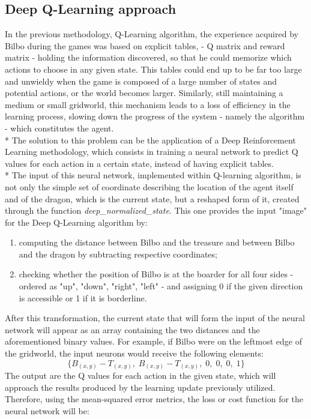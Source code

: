\subsection{Deep Q-Learning approach}
In the previous methodology, Q-Learning algorithm, the experience acquired by Bilbo during the games was based on explicit tables, - Q matrix and reward matrix - holding the information discovered, so that he could memorize which actions to choose in any given state. This tables could end up to be far too large and unwieldy when the game is composed of a large number of states and potential actions, or the world becomes larger. Similarly, still maintaining a medium or small gridworld, this mechanism leads to a loss of efficiency in the learning process, slowing down the progress of the system - namely the algorithm - which constitutes the agent.\\*
The solution to this problem can be the application of a Deep Reinforcement Learning methodology, which consists in training a neural network to predict Q values for each action in a certain state, instead of having explicit tables.\\*
The input of this neural network, implemented within Q-learning algorithm, is not only the simple set of coordinate describing the location of the agent itself and of the dragon, which is the current state, but a reshaped form of it, created through the function \textit{deep\_normalized\_state}. This one provides the input "image" for the Deep Q-Learning algorithm by:
\begin{enumerate}
  \item computing the distance between Bilbo and the treasure and between Bilbo and the dragon by subtracting respective coordinates;
  \item checking whether the position of Bilbo is at the boarder  for all four sides - ordered as "up", "down", "right", "left" - and assigning 0 if the given direction is accessible or 1 if it is borderline.
\end{enumerate}
After this transformation, the current state that will form the input of the neural network will appear as an array containing the two distances and the aforementioned binary values. For example, if Bilbo were on the leftmost edge of the gridworld, the input neurons would receive the following elements:
$$
\{B_{(x,y)}-T_{(x,y)},\;B_{(x,y)}-T_{(x,y)},\;0,\;0,\;0,\;1\}
$$
The output are the Q values for each action in the given state, which will approach the results produced by the learning update previously utilized. Therefore, using the mean-squared error metrics, the loss or cost function for the neural network will be:
